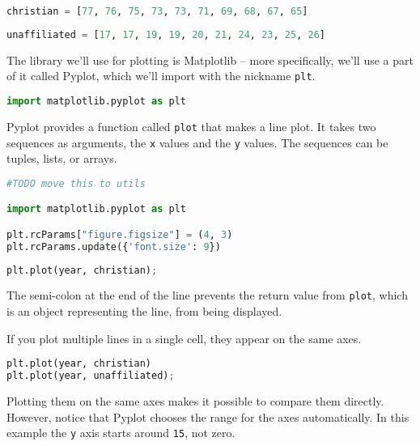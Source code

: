 \begin{lstlisting}[language=Python,style=source]
christian = [77, 76, 75, 73, 73, 71, 69, 68, 67, 65]
\end{lstlisting}

\begin{lstlisting}[language=Python,style=source]
unaffiliated = [17, 17, 19, 19, 20, 21, 24, 23, 25, 26]
\end{lstlisting}

The library we'll use for plotting is Matplotlib -- more specifically,
we'll use a part of it called Pyplot, which we'll import with the
nickname \passthrough{\lstinline!plt!}.

\begin{lstlisting}[language=Python,style=source]
import matplotlib.pyplot as plt
\end{lstlisting}

Pyplot provides a function called \passthrough{\lstinline!plot!} that
makes a line plot. It takes two sequences as arguments, the
\passthrough{\lstinline!x!} values and the \passthrough{\lstinline!y!}
values. The sequences can be tuples, lists, or arrays.

\begin{lstlisting}[language=Python,style=source]
#TODO move this to utils

import matplotlib.pyplot as plt

plt.rcParams["figure.figsize"] = (4, 3)  
plt.rcParams.update({'font.size': 9})
\end{lstlisting}

\begin{lstlisting}[language=Python,style=source]
plt.plot(year, christian);
\end{lstlisting}

The semi-colon at the end of the line prevents the return value from
\passthrough{\lstinline!plot!}, which is an object representing the
line, from being displayed.

If you plot multiple lines in a single cell, they appear on the same
axes.

\begin{lstlisting}[language=Python,style=source]
plt.plot(year, christian)
plt.plot(year, unaffiliated);
\end{lstlisting}

Plotting them on the same axes makes it possible to compare them
directly. However, notice that Pyplot chooses the range for the axes
automatically. In this example the \passthrough{\lstinline!y!} axis
starts around \passthrough{\lstinline!15!}, not zero.


